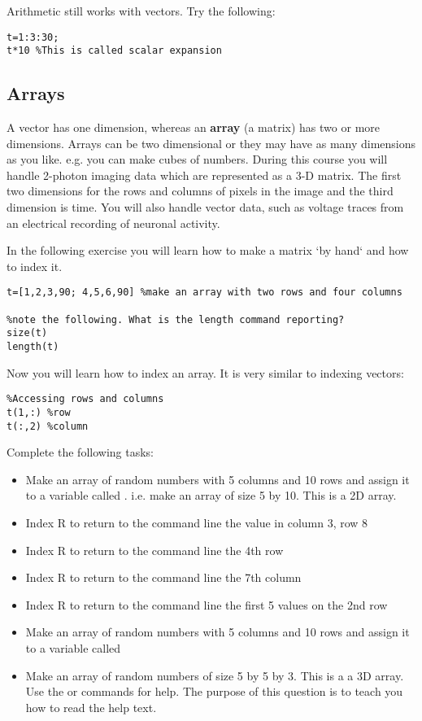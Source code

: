 \documentclass{article}
\begin{document}
Arithmetic still works with vectors. Try the following:

\begin{lstlisting}
t=1:3:30; 
t*10 %This is called scalar expansion
\end{lstlisting}

\pagebreak

\subsection*{Arrays}
A vector has one dimension, whereas an \textbf{array} (a matrix) has two or more dimensions. 
Arrays can be two dimensional or they may have as many dimensions as you like. e.g. you can make cubes of numbers.
During this course you will handle 2-photon imaging data which are represented as a 3-D matrix. The first two dimensions
for the rows and columns of pixels in the image and the third dimension is time. You will also handle vector data, such as
voltage traces from an electrical recording of neuronal activity. 

In the following exercise you will learn how to make a matrix `by hand` and how to index it.


\begin{lstlisting}
t=[1,2,3,90; 4,5,6,90] %make an array with two rows and four columns 

%note the following. What is the length command reporting?
size(t)
length(t)
\end{lstlisting}

Now you will learn how to index an array. It is very similar to indexing vectors:
\begin{lstlisting}
%Accessing rows and columns
t(1,:) %row
t(:,2) %column
\end{lstlisting}

Complete the following tasks:
\begin{itemize}
\item Make an array of random numbers with 5 columns and 10 rows and assign it to a variable called . i.e.
make an array of size 5 by 10. This is a 2D array.
\item Index R to return to the command line the value in column 3, row 8
\item Index R to return to the command line the 4th row
\item Index R to return to the command line the 7th column
\item Index R to return to the command line the first 5 values on the 2nd row
\item Make an array of random numbers  with 5 columns and 10 rows and assign it to a variable called 
\item Make an array of random numbers of size 5 by 5 by 3. This is a a 3D array. Use the  or  commands
for help. The purpose of this question is to teach you how to read the help text.
\end{itemize}
\end{document}

